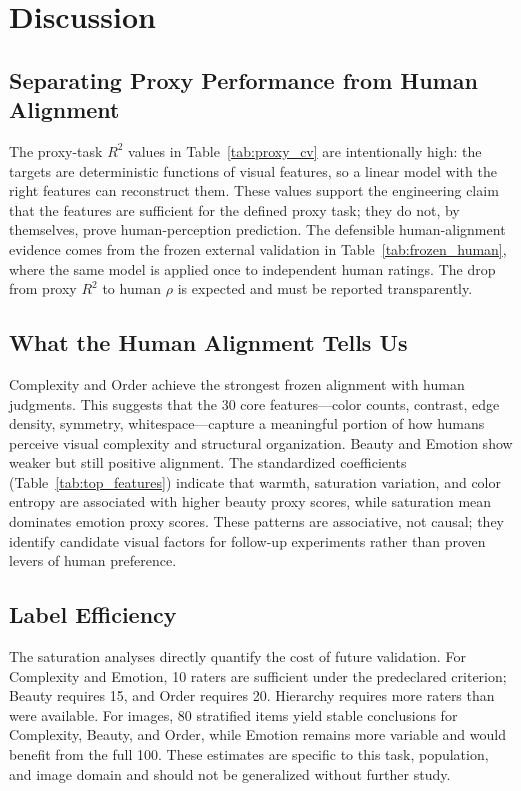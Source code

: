
\section{Discussion}
\label{sec:discussion}

\subsection{Separating Proxy Performance from Human Alignment}

The proxy-task $R^2$ values in Table~\ref{tab:proxy_cv} are intentionally high: the targets are deterministic functions of visual features, so a linear model with the right features can reconstruct them. These values support the engineering claim that the features are sufficient for the defined proxy task; they do not, by themselves, prove human-perception prediction. The defensible human-alignment evidence comes from the frozen external validation in Table~\ref{tab:frozen_human}, where the same model is applied once to independent human ratings. The drop from proxy $R^2$ to human $\rho$ is expected and must be reported transparently.

\subsection{What the Human Alignment Tells Us}

Complexity and Order achieve the strongest frozen alignment with human judgments. This suggests that the 30 core features---color counts, contrast, edge density, symmetry, whitespace---capture a meaningful portion of how humans perceive visual complexity and structural organization. Beauty and Emotion show weaker but still positive alignment. The standardized coefficients (Table~\ref{tab:top_features}) indicate that warmth, saturation variation, and color entropy are associated with higher beauty proxy scores, while saturation mean dominates emotion proxy scores. These patterns are associative, not causal; they identify candidate visual factors for follow-up experiments rather than proven levers of human preference.

\subsection{Label Efficiency}

The saturation analyses directly quantify the cost of future validation. For Complexity and Emotion, 10 raters are sufficient under the predeclared criterion; Beauty requires 15, and Order requires 20. Hierarchy requires more raters than were available. For images, 80 stratified items yield stable conclusions for Complexity, Beauty, and Order, while Emotion remains more variable and would benefit from the full 100. These estimates are specific to this task, population, and image domain and should not be generalized without further study.


